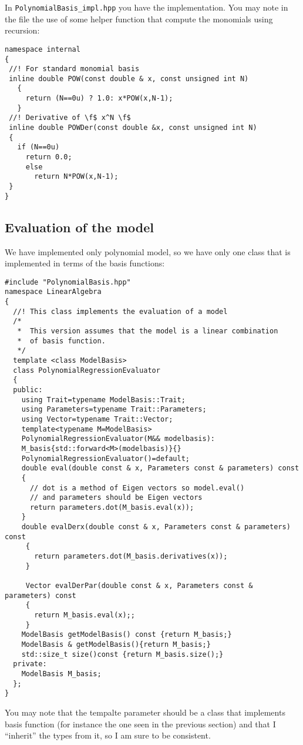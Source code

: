 \documentclass{article}
\begin{document}
In \texttt{PolynomialBasis\_impl.hpp} you have the implementation.
You may note in the file the use of some helper function that compute the monomials using recursion:
\begin{lstlisting}[title={The function for computing a monomial}]
  namespace internal
{
 //! For standard monomial basis
 inline double POW(const double & x, const unsigned int N)
   {
     return (N==0u) ? 1.0: x*POW(x,N-1);
   }
 //! Derivative of \f$ x^N \f$
 inline double POWDer(const double &x, const unsigned int N)
 {
   if (N==0u)
     return 0.0;
     else
       return N*POW(x,N-1);
 }
}
\end{lstlisting}

\subsection{Evaluation of the model}
We have implemented only polynomial model, so we have only one class
that is implemented in terms of the basis functions:
\begin{lstlisting}[title={PolynomialRegressionEvaluator.hpp}]
  #include "PolynomialBasis.hpp"
namespace LinearAlgebra
{
  //! This class implements the evaluation of a model
  /*
   *  This version assumes that the model is a linear combination
   *  of basis function.
   */
  template <class ModelBasis>
  class PolynomialRegressionEvaluator
  {
  public:
    using Trait=typename ModelBasis::Trait;
    using Parameters=typename Trait::Parameters;
    using Vector=typename Trait::Vector;
    template<typename M=ModelBasis>
    PolynomialRegressionEvaluator(M&& modelbasis):
    M_basis{std::forward<M>(modelbasis)}{}
    PolynomialRegressionEvaluator()=default;
    double eval(double const & x, Parameters const & parameters) const
    {
      // dot is a method of Eigen vectors so model.eval()
      // and parameters should be Eigen vectors
      return parameters.dot(M_basis.eval(x));
    }
    double evalDerx(double const & x, Parameters const & parameters) const
     {
       return parameters.dot(M_basis.derivatives(x));
     }

     Vector evalDerPar(double const & x, Parameters const & parameters) const
     {
       return M_basis.eval(x);;
     }
    ModelBasis getModelBasis() const {return M_basis;}
    ModelBasis & getModelBasis(){return M_basis;}
    std::size_t size()const {return M_basis.size();}
  private:
    ModelBasis M_basis;
  };
}
\end{lstlisting}
You may note that the tempalte parameter should be a class that
implements basis function (for instance the one seen in the previous
section) and that I ``inherit'' the types from it, so I am sure to be
consistent.
\end{document}
